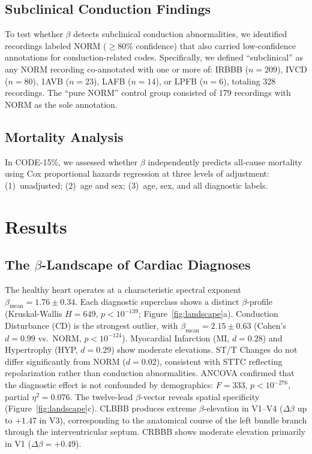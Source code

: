 \documentclass[11pt,a4paper]{article}
\begin{document}
\subsection{Subclinical Conduction Findings}
To test whether $\beta$ detects subclinical conduction abnormalities, we identified recordings labeled NORM ($\geq 80\%$ confidence) that also carried low-confidence annotations for conduction-related codes. Specifically, we defined ``subclinical'' as any NORM recording co-annotated with one or more of: IRBBB ($n = 209$), IVCD ($n = 80$), 1AVB ($n = 23$), LAFB ($n = 14$), or LPFB ($n = 6$), totaling 328 recordings. The ``pure NORM'' control group consisted of 179 recordings with NORM as the sole annotation.
\subsection{Mortality Analysis}
In CODE-15\%, we assessed whether $\beta$ independently predicts all-cause mortality using Cox proportional hazards regression at three levels of adjustment: (1)~unadjusted; (2)~age and sex; (3)~age, sex, and all diagnostic labels.
\section{Results}
\subsection{The $\beta$-Landscape of Cardiac Diagnoses}
The healthy heart operates at a characteristic spectral exponent $\beta_\text{mean} = 1.76 \pm 0.34$. Each diagnostic superclass shows a distinct $\beta$-profile (Kruskal-Wallis $H = 649$, $p < 10^{-139}$; Figure~\ref{fig:landscape}a). Conduction Disturbance (CD) is the strongest outlier, with $\beta_\text{mean} = 2.15 \pm 0.63$ (Cohen's $d = 0.99$ vs.\ NORM, $p < 10^{-124}$). Myocardial Infarction (MI, $d = 0.28$) and Hypertrophy (HYP, $d = 0.29$) show moderate elevations. ST/T Changes do not differ significantly from NORM ($d = 0.02$), consistent with STTC reflecting repolarization rather than conduction abnormalities.
ANCOVA confirmed that the diagnostic effect is not confounded by demographics: $F = 333$, $p < 10^{-276}$, partial $\eta^2 = 0.076$.
The twelve-lead $\beta$-vector reveals spatial specificity (Figure~\ref{fig:landscape}c). CLBBB produces extreme $\beta$-elevation in V1--V4 ($\Delta\beta$ up to $+1.47$ in V3), corresponding to the anatomical course of the left bundle branch through the interventricular septum. CRBBB shows moderate elevation primarily in V1 ($\Delta\beta = +0.49$).
\end{document}
